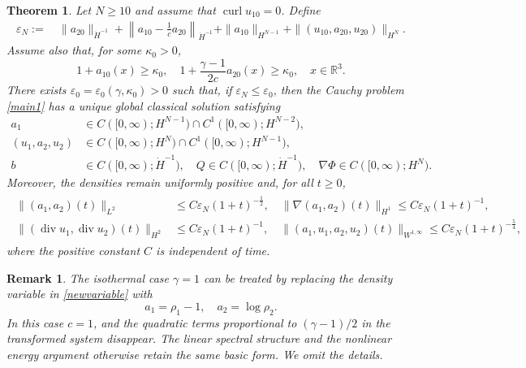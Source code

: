 \documentclass[10pt,reqno]{amsart}
\numberwithin{equation}{section}
\newtheorem{thm}{Theorem}[section]
\newtheorem{rem}{Remark}[section]
\begin{document}
\begin{thm}\label{thm-main}
Let $N\ge 10$ and assume that $\operatorname{curl}u_{10}=0$. Define
\begin{align}\label{main-smallness}
\varepsilon_N:=&\ \|a_{20}\|_{\dot H^{-1}} +\left\|a_{10}-\frac1c a_{20}\right\|_{\dot H^{-1}} +\|a_{10}\|_{H^{N-1}} +\|(u_{10},a_{20},u_{20})\|_{H^N}.
\end{align}
Assume also that, for some $\kappa_0>0$,
\[
1+a_{10}(x)\ge\kappa_0,\quad 1+\frac{\gamma-1}{2c}a_{20}(x)\ge\kappa_0, \quad x\in\mathbb R^3.
\]
There exists $\varepsilon_0=\varepsilon_0(\gamma,\kappa_0)>0$ such that, if $\varepsilon_N\le\varepsilon_0$, then the Cauchy problem \eqref{main1} has a unique global classical solution satisfying
\begin{align*}
a_1&\in C([0,\infty);H^{N-1}) \cap C^1([0,\infty);H^{N-2}),\\
(u_1,a_2,u_2)&\in C([0,\infty);H^N) \cap C^1([0,\infty);H^{N-1}),\\
b&\in C([0,\infty);\dot H^{-1}),\quad Q \in C([0,\infty);\dot H^{-1}),\quad \nabla\Phi \in C([0,\infty);H^N).
\end{align*}
Moreover, the densities remain uniformly positive and, for all $t\ge0$,
\begin{align}\label{main-decay-statement}
\begin{aligned}
\|(a_1,a_2)(t)\|_{L^2} &\le C\varepsilon_N(1+t)^{-\frac12},\quad \|\nabla(a_1,a_2)(t)\|_{H^1} \le C\varepsilon_N(1+t)^{-1},\\
\|(\operatorname{div}u_1,\operatorname{div}u_2)(t)\|_{H^2}
&\le C\varepsilon_N(1+t)^{-1},\quad \|(a_1,u_1,a_2,u_2)(t)\|_{W^{1,\infty}} \le C\varepsilon_N(1+t)^{-\frac54},
\end{aligned}
\end{align}
where the positive constant $C$ is independent of time.
\end{thm}

\begin{rem}%
The isothermal case $\gamma=1$ can be treated by replacing the density variable in \eqref{newvariable} with
\[
a_1=\rho_1-1,\quad a_2=\log\rho_2.
\]
In this case $c=1$, and the quadratic terms proportional to $(\gamma-1)/2$ in the transformed system disappear. The linear spectral structure and the nonlinear energy argument otherwise retain the same basic form. We omit the details.
\end{rem}


%
%
%
%
%
%
\end{document}

